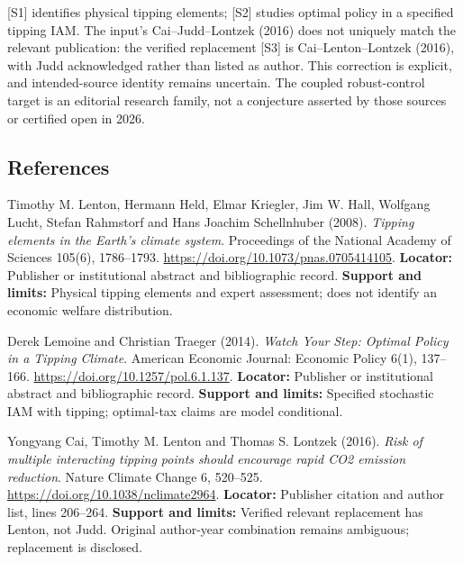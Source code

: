 \documentclass[11pt,a4paper]{article}
\begin{document}
[S1] identifies physical tipping elements; [S2] studies optimal policy in a specified tipping IAM. The input's Cai--Judd--Lontzek (2016) does not uniquely match the relevant publication: the verified replacement [S3] is Cai--Lenton--Lontzek (2016), with Judd acknowledged rather than listed as author. This correction is explicit, and intended-source identity remains uncertain. The coupled robust-control target is an editorial research family, not a conjecture asserted by those sources or certified open in 2026.

\subsection*{References}

\begin{enumerate}[label={[\textnormal{S}\arabic*]},leftmargin=*]

\item Timothy M. Lenton, Hermann Held, Elmar Kriegler, Jim W. Hall, Wolfgang Lucht, Stefan Rahmstorf and Hans Joachim Schellnhuber (2008). \emph{Tipping elements in the Earth’s climate system}. Proceedings of the National Academy of Sciences 105(6), 1786–1793. \url{https://doi.org/10.1073/pnas.0705414105}. \textbf{Locator:} Publisher or institutional abstract and bibliographic record. \textbf{Support and limits:} Physical tipping elements and expert assessment; does not identify an economic welfare distribution.

\item Derek Lemoine and Christian Traeger (2014). \emph{Watch Your Step: Optimal Policy in a Tipping Climate}. American Economic Journal: Economic Policy 6(1), 137–166. \url{https://doi.org/10.1257/pol.6.1.137}. \textbf{Locator:} Publisher or institutional abstract and bibliographic record. \textbf{Support and limits:} Specified stochastic IAM with tipping; optimal-tax claims are model conditional.

\item Yongyang Cai, Timothy M. Lenton and Thomas S. Lontzek (2016). \emph{Risk of multiple interacting tipping points should encourage rapid CO2 emission reduction}. Nature Climate Change 6, 520–525. \url{https://doi.org/10.1038/nclimate2964}. \textbf{Locator:} Publisher citation and author list, lines 206–264. \textbf{Support and limits:} Verified relevant replacement has Lenton, not Judd. Original author-year combination remains ambiguous; replacement is disclosed.

\end{enumerate}
\end{document}
